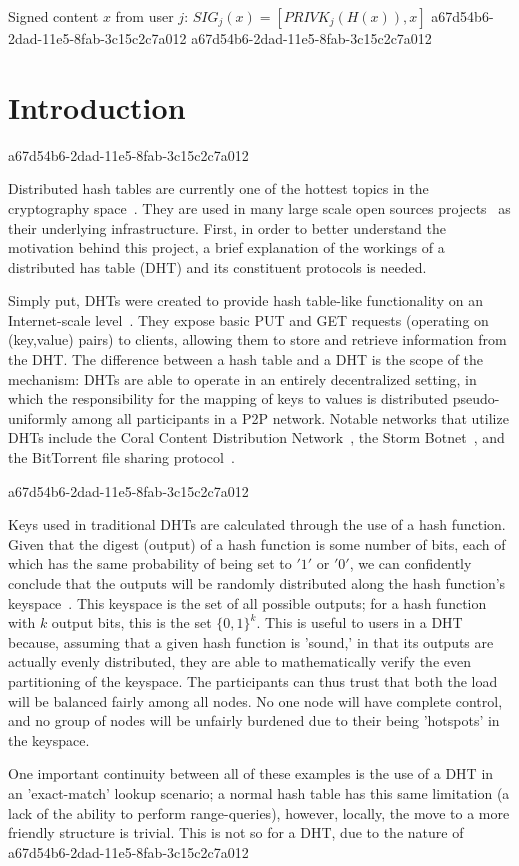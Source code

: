 \documentclass[12pt]{article}
\begin{document}
Signed content $x$ from user $j$: $SIG_j(x) = \left[ PRIVK_j( H(x) ), x \right]$
a67d54b6-2dad-11e5-8fab-3c15c2c7a012
a67d54b6-2dad-11e5-8fab-3c15c2c7a012\section{Introduction}
a67d54b6-2dad-11e5-8fab-3c15c2c7a012\par Distributed hash tables are currently one of the hottest topics in the cryptography space~\cite{Stoica:2001dj,Rowstron:2001ea,Ratnasamy:2001wn}. They are used in many large scale open sources projects~\cite{Freitas:2013tb,Xu:2010vs,Perfitt:2010fh} as their underlying infrastructure. First, in order to better understand the motivation behind this project, a brief explanation of the workings of a distributed has table (DHT) and its constituent protocols is needed.

\par Simply put, DHTs were created to provide hash table-like functionality on an Internet-scale level~\cite{Ratnasamy:2001wn}. They expose basic PUT and GET requests (operating on (key,value) pairs) to clients, allowing them to store and retrieve information from the DHT. The difference between a hash table and a DHT is the scope of the mechanism: DHTs are able to operate in an entirely decentralized setting, in which the responsibility for the mapping of keys to values is distributed pseudo-uniformly among all participants in a P2P network. Notable networks that utilize DHTs include the Coral Content Distribution Network~\cite{Freedman:2004vb}, the Storm Botnet~\cite{Holz:2008uk}, and the BitTorrent file sharing protocol~\cite{Cohen:y1_8mBnw}.

a67d54b6-2dad-11e5-8fab-3c15c2c7a012\par Keys used in traditional DHTs are calculated through the use of a hash function. Given that the digest (output) of a hash function is some number of bits, each of which has the same probability of being set to $'1'$ or $'0'$, we can confidently conclude that the outputs will be randomly distributed along the hash function's keyspace~. This keyspace is the set of all possible outputs; for a hash function with $k$ output bits, this is the set $\{0,1\}^k$. This is useful to users in a DHT because, assuming that a given hash function is 'sound,' in that its outputs are actually evenly distributed, they are able to mathematically verify the even partitioning of the keyspace. The participants can thus trust that both the load will be balanced fairly among all nodes. No one node will have complete control, and no group of nodes will be unfairly burdened due to their being 'hotspots' in the keyspace.~

\par One important continuity between all of these examples is the use of a DHT in an 'exact-match' lookup scenario; a normal hash table has this same limitation (a lack of the ability to perform range-queries), however, locally, the move to a more friendly structure is trivial. This is not so for a DHT, due to the nature of
\printbibliography
a67d54b6-2dad-11e5-8fab-3c15c2c7a012
\end{document}
